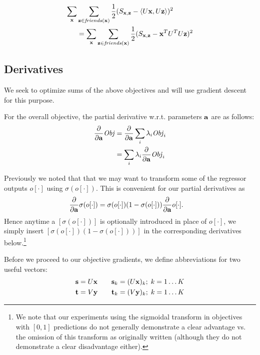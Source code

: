 \begin{align*}
\sum_{\mathbf{x}} & \sum_{\mathbf{z} \in \mathit{friends}(\mathbf{x})} \frac{1}{2} (S_{\mathbf{x},\mathbf{z}} - \langle U\mathbf{x}, U\mathbf{z} \rangle)^2 \nonumber \\
& = \sum_{\mathbf{x}} \sum_{\mathbf{z} \in \mathit{friends}(\mathbf{x})} \frac{1}{2} (S_{\mathbf{x},\mathbf{z}} - \mathbf{x}^T U^T U \mathbf{z})^2
\end{align*}

\subsection{Derivatives}

We seek to optimize sums of the above objectives and will use
gradient descent for this purpose.  

For the overall objective, the partial derivative 
w.r.t. parameters $\mathbf{a}$ are as follows:
\begin{align*}
\frac{\partial}{\partial \mathbf{a}} \mathit{Obj} & = \frac{\partial}{\partial \mathbf{a}} \sum_i \lambda_i \mathit{Obj}_i\\
& = \sum_i \lambda_i \frac{\partial}{\partial \mathbf{a}} \mathit{Obj}_i \label{eq:sum_der}
\end{align*}

Previously we noted that that we may want to transform
some of the regressor outputs $o[\cdot]$ using $\sigma(o[\cdot])$.  
This is convenient for our partial derivatives as
\begin{align}
 \frac{\partial}{\partial \mathbf{a}}\sigma(o[\cdot]) & = \sigma(o[\cdot]) (1 - \sigma(o[\cdot])) \frac{\partial}{\partial \mathbf{a}} o[\cdot] .
\end{align}
Hence anytime a $[\sigma(o[\cdot])]$ is optionally 
introduced in place of $o[\cdot]$, we simply
insert $[\sigma(o[\cdot]) (1 - \sigma(o[\cdot]))]$ in the corresponding derivatives 
below.\footnote{We note that our experiments using the sigmoidal transform in
objectives with $[0,1]$ predictions do not generally demonstrate a
clear advantage vs. the omission of this transform as originally
written (although they do not demonstrate a clear disadvantage
either).}

Before we proceed to our objective gradients, we define abbreviations
for two useful vectors:
\begin{align*}
\mathbf{s} & = U \mathbf{x} \qquad \mathbf{s}_{k} = (U \mathbf{x})_{k}; \; k=1\ldots K\\
\mathbf{t} & = V \mathbf{y} \qquad \mathbf{t}_{k} = (V \mathbf{y})_{k}; \; k=1\ldots K
\end{align*}

